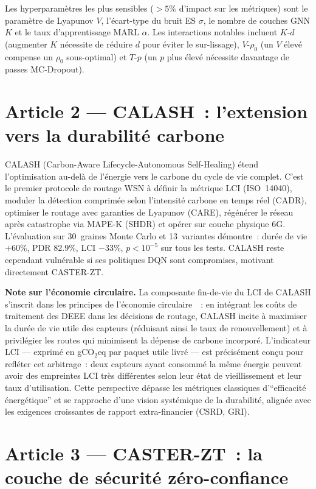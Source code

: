 Les hyperparamètres les plus sensibles ($>5\%$ d'impact sur les métriques) sont le paramètre de Lyapunov $V$, l'écart-type du bruit ES $\sigma$, le nombre de couches GNN $K$ et le taux d'apprentissage MARL $\alpha$. Les interactions notables incluent $K$-$d$ (augmenter $K$ nécessite de réduire $d$ pour éviter le sur-lissage), $V$-$\rho_0$ (un $V$ élevé compense un $\rho_0$ sous-optimal) et $T$-$p$ (un $p$ plus élevé nécessite davantage de passes MC-Dropout).


\section{Article 2 --- CALASH~: l'extension vers la durabilité carbone}\label{sec:demarche-art2}

CALASH (Carbon-Aware Lifecycle-Autonomous Self-Healing) étend l'optimisation au-delà de l'énergie vers le carbone du cycle de vie complet. C'est le premier protocole de routage WSN à définir la métrique LCI (ISO~14040), moduler la détection comprimée selon l'intensité carbone en temps réel (CADR), optimiser le routage avec garanties de Lyapunov (CARE), régénérer le réseau après catastrophe via MAPE-K (SHDR) et opérer sur couche physique 6G. L'évaluation sur 30~graines Monte Carlo et 13~variantes démontre~: durée de vie $+$60\%, PDR 82.9\%, LCI $-$33\%, $p < 10^{-5}$ sur tous les tests. CALASH reste cependant vulnérable si ses politiques DQN sont compromises, motivant directement CASTER-ZT.

\textbf{Note sur l'économie circulaire.}
La composante fin-de-vie du LCI de CALASH s'inscrit dans les principes de l'économie circulaire~\cite{iso14040}~: en intégrant les coûts de traitement des DEEE dans les décisions de routage, CALASH incite à maximiser la durée de vie utile des capteurs (réduisant ainsi le taux de renouvellement) et à privilégier les routes qui minimisent la dépense de carbone incorporé. L'indicateur LCI --- exprimé en gCO$_2$eq par paquet utile livré --- est précisément conçu pour refléter cet arbitrage~: deux capteurs ayant consommé la même énergie peuvent avoir des empreintes LCI très différentes selon leur état de vieillissement et leur taux d'utilisation. Cette perspective dépasse les métriques classiques d'``efficacité énergétique'' et se rapproche d'une vision systémique de la durabilité, alignée avec les exigences croissantes de rapport extra-financier (CSRD, GRI).


\section{Article 3 --- CASTER-ZT~: la couche de sécurité zéro-confiance}\label{sec:demarche-art3}

